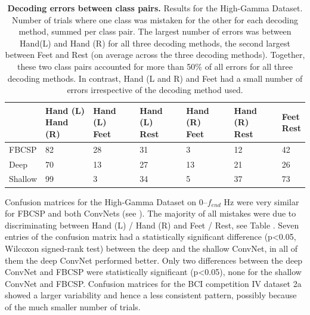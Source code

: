 \begin{table}[htb]
\centering \footnotesize
\begin{tabular}{lllllll}\toprule
&
\tableheadline{\parbox{0.12\linewidth}{Hand (L)\\Hand (R)}} & 
\tableheadline{\parbox{0.12\linewidth}{Hand (L)\\Feet}} & 
\tableheadline{\parbox{0.12\linewidth}{Hand (L)\\Rest}} & 
\tableheadline{\parbox{0.12\linewidth}{Hand (R)\\Feet}} & 
\tableheadline{\parbox{0.12\linewidth}{Hand (R)\\Rest}} & 
\tableheadline{\parbox{0.05\linewidth}{Feet\\Rest}} \\\midrule
 FBCSP & 82 & 28 & 31 & 3 & 12 & 42 \\ 
 Deep & 70 & 13 & 27 & 13 & 21 & 26 \\ 
 Shallow & 99 & 3 & 34 & 5 & 37 & 73 \\ 
  \bottomrule
\hline
\end{tabular}
\caption[Decoding errors between class pairs]{\textbf{Decoding errors between class pairs.} Results for the High-Gamma Dataset.
Number of trials where one class  was mistaken for the
other for each decoding method, summed per class pair. The largest
number of errors was between Hand(L) and Hand (R) for all three
decoding methods, the second largest between Feet and Rest (on average
across the three decoding methods). Together, these two class pairs
accounted for more than 50\% of all errors for all three decoding
methods. In contrast, Hand (L and R) and Feet had a small number of
errors irrespective of the decoding method used.}
\label{hgd-class-mistakes-table} 
\end{table}

    Confusion matrices for the High-Gamma Dataset on 0--$f_{end}$ Hz were
very similar for FBCSP and both ConvNets (see
). The majority of all mistakes
were due to discriminating between Hand (L) / Hand (R) and Feet / Rest,
see Table . Seven entries of
the confusion matrix had a statistically significant difference
(p\textless0.05, Wilcoxon signed-rank test) between the deep and the
shallow ConvNet, in all of them the deep ConvNet performed better. Only
two differences between the deep ConvNet and FBCSP were statistically
significant (p\textless0.05), none for the shallow ConvNet and FBCSP.
Confusion matrices for the BCI competition IV dataset 2a showed a larger
variability and hence a less consistent pattern, possibly because of the
much smaller number of trials.

